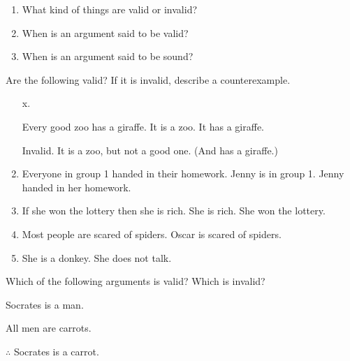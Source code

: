 \begin{practiceproblems}
\problempart
\begin{enumerate}
\item What kind of things are valid or invalid?
\item When is an argument said to be valid?
\item When is an argument said to be sound?
\end{enumerate}

\problempart
Are the following valid? If it is invalid, describe a counterexample.
\begin{enumerate}
\item[x.]
\begin{earg}
\prem Every good zoo has a giraffe.
\prem It is a zoo.
\conc It has a giraffe.
\end{earg}
\prem Invalid. It is a zoo, but not a good one. (And has a giraffe.)
\item
\begin{earg}
\prem Everyone in group 1 handed in their homework.
\prem Jenny is in group 1.
\conc Jenny handed in her homework.
\end{earg}
\item
\begin{earg}
\prem If she won the lottery then she is rich.
\prem She is rich.
\conc She won the lottery.
\end{earg}
\item
\begin{earg}
\prem Most people are scared of spiders.
\conc Oscar is scared of spiders.
\end{earg}
\item
\begin{earg}
\prem She is a donkey.
\conc She does not talk.
\end{earg}
\end{enumerate}


\problempart
Which of the following arguments is valid? Which is invalid?

\begin{earg}
\item Socrates is a man.
\item All men are carrots.
\item[$\therefore$]  Socrates is a carrot. \hfill {}
\end{earg}


\end{practiceproblems}
